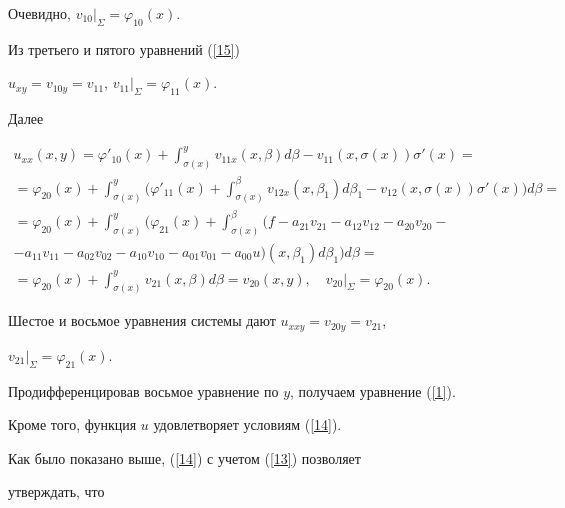 Очевидно, $v_{10}\vert_{\Sigma}=\varphi_{10}(x)$.


Из третьего и пятого уравнений (\ref{15})


$u_{xy}=v_{10y}=v_{11}$, $v_{11}\vert_{\Sigma}=\varphi_{11}(x)$.


Далее


\begin{multline*}


u_{xx}(x,y)=\varphi'_{10}(x)+\int_{\sigma(x)}^{y}


v_{11x}(x,\beta)d\beta-v_{11}(x,\sigma(x))\sigma'(x)=\\


%


=\varphi_{20}(x)+\int_{\sigma(x)}^{y}


\bigg(\varphi'_{11}(x)+\int_{\sigma(x)}^{\beta}v_{12x}(x,\beta_{1})d\beta_{1}


-v_{12}(x,\sigma(x))\sigma'(x)\bigg)d\beta=\\


%


=\varphi_{20}(x)+\int_{\sigma(x)}^{y}


\bigg(\varphi_{21}(x)+\int_{\sigma(x)}^{\beta}


(f-a_{21}v_{21}-a_{12}v_{12}-a_{20}v_{20}-\\


%


-a_{11}v_{11}-a_{02}v_{02}-a_{10}v_{10}-a_{01}v_{01}-a_{00}u)


(x,\beta_{1})d\beta_{1}\bigg)d\beta=\\


%


=\varphi_{20}(x)+\int_{\sigma(x)}^{y}v_{21}(x,\beta)d\beta=v_{20}(x,y),


\quad v_{20}\vert_{\Sigma}=\varphi_{20}(x).


\end{multline*}


Шестое и восьмое уравнения системы дают $u_{xxy}=v_{20y}=v_{21}$,


$v_{21}\vert_{\Sigma}=\varphi_{21}(x)$.


Продифференцировав восьмое уравнение по $y$, получаем уравнение (\ref{1}).


Кроме того, функция $u$ удовлетворяет условиям (\ref{14}).


Как было показано выше, (\ref{14}) с учетом (\ref{13}) позволяет


утверждать, что


$$


